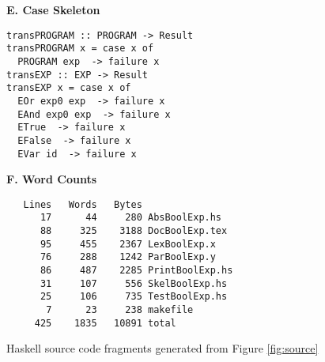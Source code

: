 \begin{figure}
\begin{boxedminipage}[t]{\textwidth}
\begin{minipage}[r]{0.48\textwidth}
\textbf{E. Case Skeleton}

\scriptsize
\begin{verbatim}
transPROGRAM :: PROGRAM -> Result
transPROGRAM x = case x of
  PROGRAM exp  -> failure x
transEXP :: EXP -> Result
transEXP x = case x of
  EOr exp0 exp  -> failure x
  EAnd exp0 exp  -> failure x
  ETrue  -> failure x
  EFalse  -> failure x
  EVar id  -> failure x
\end{verbatim}
\normalsize

\textbf{F. Word Counts}
\scriptsize
\begin{verbatim}
   Lines   Words   Bytes
      17      44     280 AbsBoolExp.hs
      88     325    3188 DocBoolExp.tex
      95     455    2367 LexBoolExp.x
      76     288    1242 ParBoolExp.y
      86     487    2285 PrintBoolExp.hs
      31     107     556 SkelBoolExp.hs
      25     106     735 TestBoolExp.hs
       7      23     238 makefile
     425    1835   10891 total
\end{verbatim}
\normalsize
\hfill
\end{minipage}
\end{boxedminipage}
\caption{Haskell source code fragments generated from Figure \ref{fig:source}}
\label{fig:haskell}
\end{figure}

